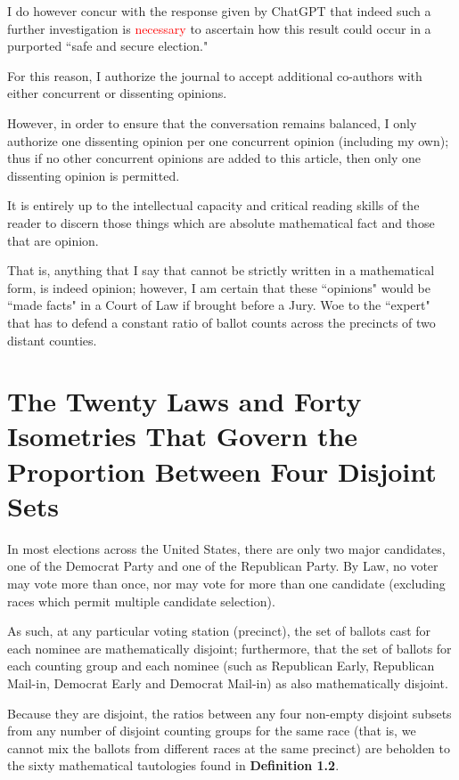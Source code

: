 \documentclass[preprint,13pt]{elsarticle}
\begin{document}
I do however concur with the response given by ChatGPT that indeed such a further investigation is \textcolor{red}{necessary} to ascertain how this result could occur in a purported ``safe and secure election."

For this reason, I authorize the journal to accept additional co-authors with either concurrent or dissenting opinions.

However, in order to ensure that the conversation remains balanced, I only authorize one dissenting opinion per one concurrent opinion (including my own); thus if no other concurrent opinions are added to this article, then only one dissenting opinion is permitted.

It is entirely up to the intellectual capacity and critical reading skills of the reader to discern those things which are absolute mathematical fact and those that are opinion. 

That is, anything that I say that cannot be strictly written in a mathematical form, is indeed opinion; however, I am certain that these ``opinions" would be ``made facts" in a Court of Law if brought before a Jury. Woe to the ``expert" that has to defend a constant ratio of ballot counts across the precincts of two distant counties.

\newpage
\section{The Twenty Laws and Forty Isometries That Govern the Proportion Between Four Disjoint Sets}
In most elections across the United States, there are only two major candidates, one of the Democrat Party and one of the Republican Party. By Law, no voter may vote more than once, nor may vote for more than one candidate (excluding races which permit multiple candidate selection).

As such, at any particular voting station (precinct), the set of ballots cast for each nominee are mathematically disjoint; furthermore, that the set of ballots for each counting group and each nominee (such as Republican Early, Republican Mail-in, Democrat Early and Democrat Mail-in) as also mathematically disjoint.

Because they are disjoint, the ratios between any four non-empty disjoint subsets from any number of disjoint counting groups for the same race (that is, we cannot mix the ballots from different races at the same precinct) are beholden to the sixty mathematical tautologies found in \textbf{Definition 1.2}.
\end{document}
